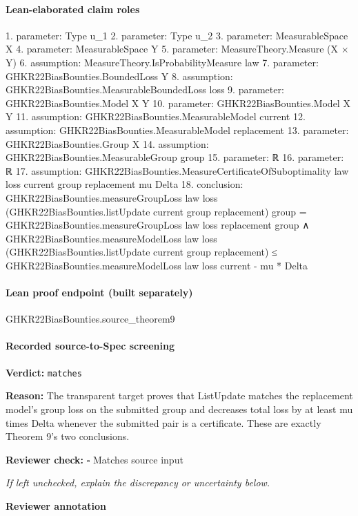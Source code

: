 \documentclass[10pt]{article}
\newcommand{\reviewerbox}{%
  \par\noindent\fbox{\parbox{0.96\linewidth}{\rule{0pt}{0.38in}}}\par
}
\newcommand{\reviewmatch}[1]{%
  \par\noindent\textbf{Reviewer check:} $\square$\; #1\par
  \noindent\emph{If left unchecked, explain the discrepancy or uncertainty below.}\par
}
\begin{document}
\paragraph{Lean-elaborated claim roles}\begin{ReviewVerbatim}
1. parameter: Type u_1
2. parameter: Type u_2
3. parameter: MeasurableSpace X
4. parameter: MeasurableSpace Y
5. parameter: MeasureTheory.Measure (X × Y)
6. assumption: MeasureTheory.IsProbabilityMeasure law
7. parameter: GHKR22BiasBounties.BoundedLoss Y
8. assumption: GHKR22BiasBounties.MeasurableBoundedLoss loss
9. parameter: GHKR22BiasBounties.Model X Y
10. parameter: GHKR22BiasBounties.Model X Y
11. assumption: GHKR22BiasBounties.MeasurableModel current
12. assumption: GHKR22BiasBounties.MeasurableModel replacement
13. parameter: GHKR22BiasBounties.Group X
14. assumption: GHKR22BiasBounties.MeasurableGroup group
15. parameter: ℝ
16. parameter: ℝ
17. assumption: GHKR22BiasBounties.MeasureCertificateOfSuboptimality law loss current group replacement mu Delta
18. conclusion: GHKR22BiasBounties.measureGroupLoss law loss (GHKR22BiasBounties.listUpdate current group replacement) group =
    GHKR22BiasBounties.measureGroupLoss law loss replacement group ∧
  GHKR22BiasBounties.measureModelLoss law loss (GHKR22BiasBounties.listUpdate current group replacement) ≤
    GHKR22BiasBounties.measureModelLoss law loss current - mu * Delta
\end{ReviewVerbatim}

\paragraph{Lean proof endpoint (built separately)}\begin{ReviewVerbatim}
GHKR22BiasBounties.source_theorem9
\end{ReviewVerbatim}

\paragraph{Recorded source-to-Spec screening}
\textbf{Verdict:} \texttt{matches}
\\
{\raggedright
\textbf{Reason:} The transparent target proves that ListUpdate matches the replacement model's group loss on the submitted group and decreases total loss by at least mu times Delta whenever the submitted pair is a certificate.\allowbreak{} These are exactly Theorem 9's two conclusions.\allowbreak{}
\par}
\reviewmatch{Matches source input}
\noindent\textbf{Reviewer annotation}\par
\reviewerbox
\clearpage
\hypertarget{source-claim-f5b121c709a75d33}{}
\end{document}
